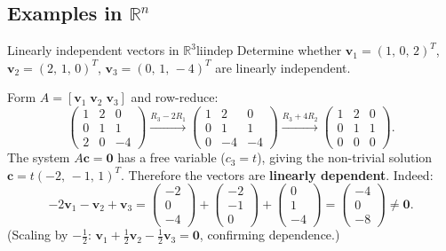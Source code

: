 \documentclass[12pt,a4paper]{article}
\newcommand{\R}{\mathbb{R}}
\newcommand{\vv}[1]{\mathbf{#1}}
\newcommand{\vzero}{\mathbf{0}}
\begin{document}
		\subsection{Examples in \texorpdfstring{$\R^n$}{Rn}}
		
		\begin{example}{Linearly independent vectors in $\R^3$}{liindep}
			Determine whether
			$\vv{v}_1 = (1,\,0,\,2)^T$,
			$\vv{v}_2 = (2,\,1,\,0)^T$,
			$\vv{v}_3 = (0,\,1,\,-4)^T$
			are linearly independent.
			
			Form $A = [\vv{v}_1\;\vv{v}_2\;\vv{v}_3]$ and row-reduce:
			\[
			\begin{pmatrix}
				1 & 2 &  0 \\
				0 & 1 &  1 \\
				2 & 0 & -4
			\end{pmatrix}
			\xrightarrow{R_3 - 2R_1}
			\begin{pmatrix}
				1 & 2 &  0 \\
				0 & 1 &  1 \\
				0 &-4 & -4
			\end{pmatrix}
			\xrightarrow{R_3 + 4R_2}
			\begin{pmatrix}
				1 & 2 & 0 \\
				0 & 1 & 1 \\
				0 & 0 & 0
			\end{pmatrix}.
			\]
			The system $A\vv{c} = \vzero$ has a free variable ($c_3 = t$), giving the
			non-trivial solution $\vv{c} = t(-2,\,-1,\,1)^T$.  Therefore the vectors are
			\textbf{linearly dependent}.  Indeed:
			\[
			-2\vv{v}_1 - \vv{v}_2 + \vv{v}_3
			= \begin{pmatrix}-2\\0\\-4\end{pmatrix}
			+ \begin{pmatrix}-2\\-1\\0\end{pmatrix}
			+ \begin{pmatrix}0\\1\\-4\end{pmatrix}
			= \begin{pmatrix}-4\\0\\-8\end{pmatrix}
			\neq \vzero.
			\]
			(Scaling by $-\tfrac{1}{2}$: $\vv{v}_1 + \tfrac{1}{2}\vv{v}_2 -
			\tfrac{1}{2}\vv{v}_3 = \vzero$, confirming dependence.)
		\end{example}
		
\end{document}
